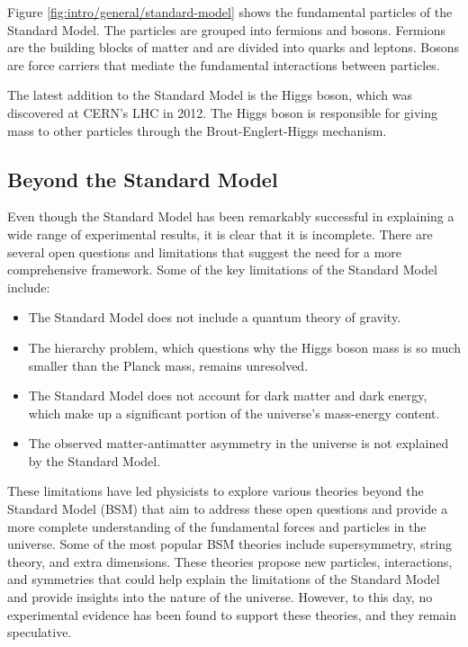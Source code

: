Figure \ref{fig:intro/general/standard-model} shows the fundamental particles of the Standard Model. The particles are grouped into fermions and bosons. Fermions are the building blocks of matter and are divided into quarks and leptons. Bosons are force carriers that mediate the fundamental interactions between particles.

The latest addition to the Standard Model is the Higgs boson, which was discovered at CERN's LHC in 2012. The Higgs boson is responsible for giving mass to other particles through the Brout-Englert-Higgs mechanism.

\subsection{Beyond the Standard Model}

Even though the Standard Model has been remarkably successful in explaining a wide range of experimental results, it is clear that it is incomplete. There are several open questions and limitations that suggest the need for a more comprehensive framework. Some of the key limitations of the Standard Model include:

\begin{itemize}
    \item The Standard Model does not include a quantum theory of gravity.
    \item The hierarchy problem, which questions why the Higgs boson mass is so much smaller than the Planck mass, remains unresolved.
    \item The Standard Model does not account for dark matter and dark energy, which make up a significant portion of the universe's mass-energy content.
    \item The observed matter-antimatter asymmetry in the universe is not explained by the Standard Model.
\end{itemize}

These limitations have led physicists to explore various theories beyond the Standard Model (BSM) that aim to address these open questions and provide a more complete understanding of the fundamental forces and particles in the universe. Some of the most popular BSM theories include supersymmetry, string theory, and extra dimensions. These theories propose new particles, interactions, and symmetries that could help explain the limitations of the Standard Model and provide insights into the nature of the universe. However, to this day, no experimental evidence has been found to support these theories, and they remain speculative.

